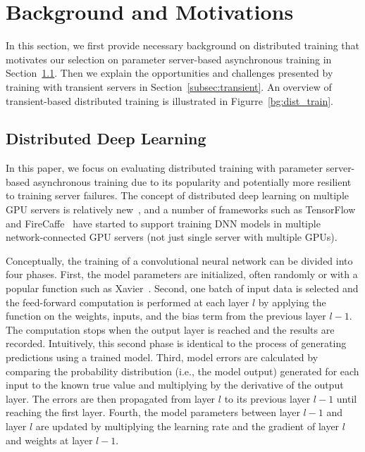 \section{Background and Motivations}
\label{sec:bg}

In this section, we first provide necessary background on distributed training
that motivates our selection on parameter server-based asynchronous training in
Section~\ref{subsec:ddl}.  Then we explain the opportunities and challenges
presented by training with transient servers in Section~\ref{subsec:transient}.
An overview of transient-based distributed training is illustrated in
Figurre~\ref{bg:dist_train}.  


\subsection{Distributed Deep Learning}
\label{subsec:ddl}

In this paper, we focus on evaluating distributed training with parameter
server-based asynchronous training due to its popularity and potentially more
resilient to training server failures.  The concept of distributed deep
learning on multiple GPU servers is relatively new~\cite{jeffdean}, and a
number of frameworks such as TensorFlow~\cite{tensorflow} and FireCaffe~\cite{firecaffe}
have started to support training DNN models in multiple network-connected GPU
servers (not just single server with multiple GPUs). 


Conceptually, the training of a convolutional neural network can be divided
into four phases.
First, the model parameters are initialized, often randomly or with a popular function such as
Xavier~\cite{glorot2010understanding}.  Second, one batch of input data  is
selected and the feed-forward computation is performed at each layer $l$ by
applying the function on the weights, inputs, and the bias term from the
previous layer $l-1$. The computation stops when the output layer is reached
and the results are recorded.  Intuitively, this second phase is identical to
the process of generating predictions using a trained model.  Third, model
errors are calculated by comparing the probability distribution (i.e., the
model output) generated for each input  to the known  true value and
multiplying by the derivative of the output layer. The errors are then
propagated from layer $l$ to its previous layer $l-1$ until reaching the first
layer.  Fourth, the model parameters between layer $l-1$ and layer $l$ are
updated by multiplying the learning rate and the gradient of layer $l$ and
weights at layer $l-1$. 



